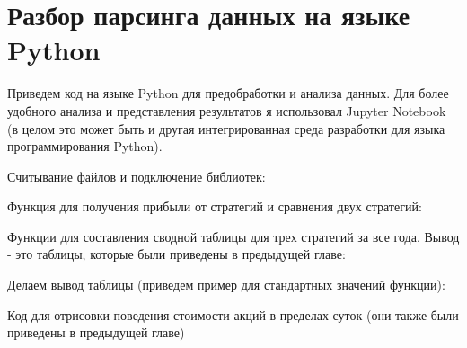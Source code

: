 \chapter{Разбор парсинга данных на языке Python}

Приведем код на языке Python для предобработки и анализа данных. Для более удобного анализа и представления результатов я использовал Jupyter Notebook (в целом это может быть и другая интегрированная среда разработки для языка программирования Python). 
\smallskip
\smallskip

Считывание файлов и подключение библиотек: 
 

Функция для получения прибыли от стратегий и сравнения двух стратегий:

 

Функции для составления сводной таблицы для трех стратегий за все года. Вывод - это таблицы, которые были приведены в предыдущей главе:

 

Делаем вывод таблицы (приведем пример для стандартных значений функции):

 

Код для отрисовки поведения стоимости акций в пределах суток (они также были приведены в предыдущей главе)

 